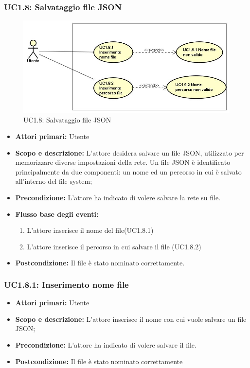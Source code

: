 \subsubsection{UC1.8: Salvataggio file JSON} 
\begin{figure} [H]
	\centering
	\includegraphics[scale=0.45]{Img/UC1-8} 
	\caption{UC1.8: Salvataggio file JSON} \label{} 
\end{figure} 
\begin{itemize} 
	\item{\textbf{Attori primari:} Utente} 
	\item{\textbf{Scopo e descrizione:} L'attore desidera salvare un file JSON, utilizzato per memorizzare diverse impostazioni della rete. Un file JSON è identificato principalmente da due componenti: un nome ed un percorso in cui è salvato all'interno del file system;} 
	\item{\textbf{Precondizione:} L'attore ha indicato di volere salvare la rete su file.} 
	\item{\textbf{Flusso base degli eventi:} } 
	\begin{enumerate} 
		\item{L'attore inserisce il nome del file(UC1.8.1)} 
		\item{L'attore inserisce il percorso in cui salvare il file (UC1.8.2)} 
	\end{enumerate} 
	\item{\textbf{Postcondizione:} Il file è stato nominato correttamente.} 
\end{itemize} 
\subsubsection{UC1.8.1: Inserimento nome file} 
\begin{itemize} 
	\item{\textbf{Attori primari:} Utente} 
	\item{\textbf{Scopo e descrizione:} L'attore inserisce il nome con cui vuole salvare un file JSON;} 
	\item{\textbf{Precondizione:} L'attore ha indicato di volere salvare il file.} 
	\item{\textbf{Postcondizione:} Il file è stato nominato correttamente} 
\end{itemize} 
